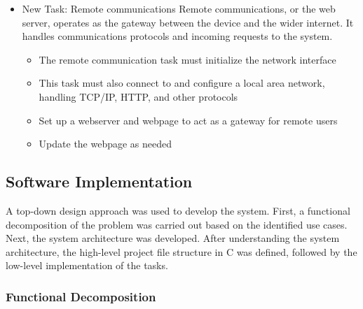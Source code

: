 \documentclass[12pt]{article} %
\begin{document}
\begin{itemize}
	\item New Task: Remote communications
		Remote communications, or the web server, operates as the gateway between
		the device and the wider internet. It handles communications protocols and
		incoming requests to the system.
		\begin{itemize}
			\item The remote communication task must initialize the network interface
			\item This task must also connect to and configure a local area network,
				handling TCP/IP, HTTP, and other protocols
			\item Set up a webserver and webpage to act as a gateway for remote users
			\item Update the webpage as needed
		\end{itemize}
\end{itemize}

    \subsection{Software Implementation}

    A top-down design approach was used to develop the system. First, a functional
    decomposition of the problem was carried out based on the identified use cases.
    Next, the system architecture was developed. After understanding the system
    architecture, the high-level project file structure in C was defined, followed
    by the low-level implementation of the tasks.

    \subsubsection{Functional Decomposition}

\end{document}
